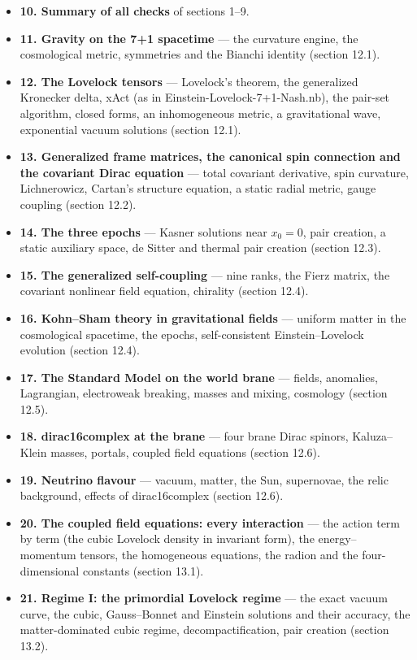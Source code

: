 \documentclass[10pt,a4paper]{article}
\begin{document}
\begin{itemize}
\item \textbf{10. Summary of all checks} of sections 1–9.
\item \textbf{11. Gravity on the 7+1 spacetime} — the curvature engine, the cosmological metric, symmetries and the Bianchi identity (section 12.1).
\item \textbf{12. The Lovelock tensors} — Lovelock’s theorem, the generalized Kronecker delta, xAct (as in Einstein-Lovelock-7+1-Nash.nb), the pair-set algorithm, closed forms, an inhomogeneous metric, a gravitational wave, exponential vacuum solutions (section 12.1).
\item \textbf{13. Generalized frame matrices, the canonical spin connection and the covariant Dirac equation} — total covariant derivative, spin curvature, Lichnerowicz, Cartan’s structure equation, a static radial metric, gauge coupling (section 12.2).
\item \textbf{14. The three epochs} — Kasner solutions near $x_0=0$, pair creation, a static auxiliary space, de Sitter and thermal pair creation (section 12.3).
\item \textbf{15. The generalized self-coupling} — nine ranks, the Fierz matrix, the covariant nonlinear field equation, chirality (section 12.4).
\item \textbf{16. Kohn–Sham theory in gravitational fields} — uniform matter in the cosmological spacetime, the epochs, self-consistent Einstein–Lovelock evolution (section 12.4).
\item \textbf{17. The Standard Model on the world brane} — fields, anomalies, Lagrangian, electroweak breaking, masses and mixing, cosmology (section 12.5).
\item \textbf{18. dirac16complex at the brane} — four brane Dirac spinors, Kaluza–Klein masses, portals, coupled field equations (section 12.6).
\item \textbf{19. Neutrino flavour} — vacuum, matter, the Sun, supernovae, the relic background, effects of dirac16complex (section 12.6).
\item \textbf{20. The coupled field equations: every interaction} — the action term by term (the cubic Lovelock density in invariant form), the energy–momentum tensors, the homogeneous equations, the radion and the four-dimensional constants (section 13.1).
\item \textbf{21. Regime I: the primordial Lovelock regime} — the exact vacuum curve, the cubic, Gauss–Bonnet and Einstein solutions and their accuracy, the matter-dominated cubic regime, decompactification, pair creation (section 13.2).

\end{itemize}
\end{document}
